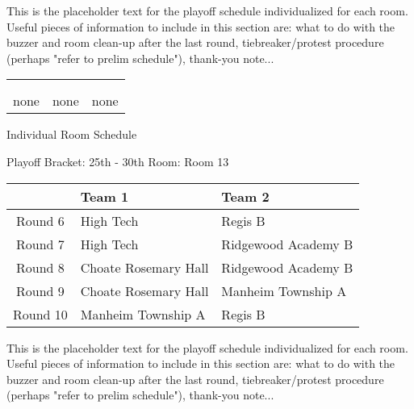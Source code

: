 \documentclass{article}%
\begin{document}
\vspace*{16pt}%
\linebreak%
This is the placeholder text for the playoff schedule individualized for each room. Useful pieces of information to include in this section are: what to do with the buzzer and room clean{-}up after the last round, tiebreaker/protest procedure (perhaps "refer to prelim schedule"), thank{-}you note...%
\vspace*{30pt}%
\newline%
%
\begin{tabularx}{\textwidth}{YYY}%
  &  &  \\%
\\%
none&none&none\\%
\end{tabularx}%
\newpage%
\begin{center}%
\begin{Huge}%
Individual Room Schedule%
\end{Huge}%
\vspace*{16pt}%
\linebreak%
\begin{Large}%
Playoff Bracket: 25th - 30th \hfill Room: Room 13%
\end{Large}%
\end{center}%
%
\begin{tabularx}{\textwidth}{|c|Y|Y|}%
\hline%
&Team 1&Team 2\\%
\hline%
Round 6&High Tech&Regis B\\%
Round 7&High Tech&Ridgewood Academy B\\%
Round 8&Choate Rosemary Hall&Ridgewood Academy B\\%
Round 9&Choate Rosemary Hall&Manheim Township A\\%
Round 10&Manheim Township A&Regis B\\%
\hline%
\end{tabularx}%
\vspace*{16pt}%
\linebreak%
This is the placeholder text for the playoff schedule individualized for each room. Useful pieces of information to include in this section are: what to do with the buzzer and room clean{-}up after the last round, tiebreaker/protest procedure (perhaps "refer to prelim schedule"), thank{-}you note...%
\vspace*{30pt}%
\newline%
\end{document}
